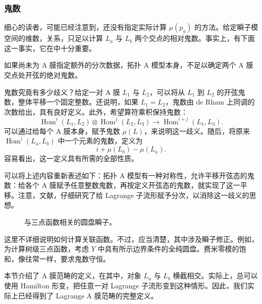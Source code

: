 \subsubsection{鬼数}\label{sec:3.6.2.6}

细心的读者，可能已经注意到，还没有指定实际计算 $\mu(p_a)$ 的方法。给定瞬子模空间的维数，关系，只足以计算 $L_a$ 与 $L_b$ 两个交点的相对鬼数。事实上，有下面这一事实，它在中十分重要。
\begin{claim}\label{claim:3.4}
如果尚未为 A 膜指定额外的分次数据，拓扑 A 模型本身，不足以确定两个 A 膜交点处开弦的绝对鬼数。
\end{claim}

鬼数究竟有多少歧义？给定一对 A 膜 $L_1$ 与 $L_2$，可以将从 $L_1$ 到 $L_2$ 的开弦鬼数，整体平移一个固定整数。还说明，如果 $L_1=L_2$，鬼数由 de Rham 上同调的次数给出，具有良好定义。此外，希望算符乘积保持鬼数：
\begin{equation}\label{eq:3.188}
\operatorname{Hom}^i(L_1,L_2)\otimes\operatorname{Hom}^j(L_2,L_3)
\longrightarrow\operatorname{Hom}^{i+j}(L_1,L_3).
\end{equation}
可以通过给每个 A 膜本身，赋予鬼数 $\mu(L)$，来说明这一歧义。随后，将原来 $\operatorname{Hom}^i(L_a,L_b)$ 中一个元素的鬼数，定义为
\begin{equation}\label{eq:3.189}
i+\mu(L_b)-\mu(L_a).
\end{equation}
容易看出，这一定义具有所需的全部性质。

可以将上述内容重新表述如下：拓扑 A 模型有一种对称性，允许平移开弦态的鬼数：给各个 A 膜赋予任意整数鬼数，再按定义开弦态的鬼数，就实现了这一平移。注意，文献，仔细研究了给 Lagrange 子流形赋予分次，以消除这一歧义的思想。
\begin{figure}[H]
\centering
{}
\caption{与三点函数相关的圆盘瞬子。}\label{fig:3.8}
\end{figure}

这里不详细说明如何计算关联函数。不过，应当清楚，其中涉及瞬子修正。例如，为计算树级三点函数，考虑 $Y$ 中具有所示边界条件的全纯圆盘。费米零模的饱和，像往常一样，要求鬼数守恒。

本节介绍了 A 膜范畴的定义，在其中，对象 $L_a$ 与 $L_b$ 横截相交。实际上，总可以使用 Hamilton 形变，把任意一对 Lagrange 子流形变到这种情形。因此，我们实际上已经得到了 Lagrange A 膜范畴的完整定义。

